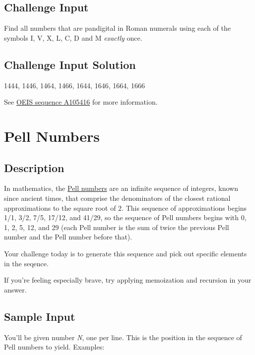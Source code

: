 \subsection*{Challenge Input}\label{challenge-input-27}

Find all numbers that are pandigital in Roman numerals using each of the
symbols I, V, X, L, C, D and M \emph{exactly} once.

\subsection*{Challenge Input Solution}\label{challenge-input-solution-2}

1444, 1446, 1464, 1466, 1644, 1646, 1664, 1666

See \href{http://oeis.org/A105416}{OEIS sequence A105416} for more
information.


\section{Pell Numbers}

\subsection*{Description}\label{description-34}

In mathematics, the
\href{https://en.wikipedia.org/wiki/Pell_number}{Pell numbers} are an
infinite sequence of integers, known since ancient times, that comprise
the denominators of the closest rational approximations to the square
root of 2. This sequence of approximations begins 1/1, 3/2, 7/5, 17/12,
and 41/29, so the sequence of Pell numbers begins with 0, 1, 2, 5, 12,
and 29 (each Pell number is the sum of twice the previous Pell number
and the Pell number before that).

Your challenge today is to generate this sequence and pick out specific
elements in the seqence.

If you're feeling especially brave, try applying memoization and
recursion in your answer.

\subsection*{Sample Input}\label{sample-input-2}

You'll be given number \emph{N}, one per line. This is the position in
the sequence of Pell numbers to yield. Examples:

